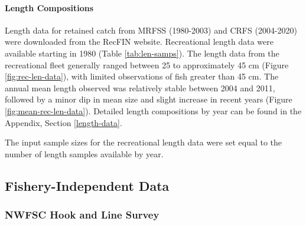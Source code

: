 \documentclass[11pt,
  english,
  a4paper,
]{article}
\begin{document}

\hypertarget{length-compositions-1}{%
\paragraph{Length Compositions}\label{length-compositions-1}}

\leavevmode\tagmcend\tagstructend


Length data for retained catch from MRFSS (1980-2003) and CRFS (2004-2020) were downloaded from the RecFIN website. Recreational length data were available starting in 1980 (Table \ref{tab:len-samps}). The length data from the recreational fleet generally ranged between 25 to approximately 45 cm (Figure \ref{fig:rec-len-data}), with limited observations of fish greater than 45 cm. The annual mean length observed was relatively stable between 2004 and 2011, followed by a minor dip in mean size and slight increase in recent years (Figure \ref{fig:mean-rec-len-data}). Detailed length compositions by year can be found in the Appendix, Section \ref{length-data}.

\leavevmode\tagmcend\tagstructend\par


The input sample sizes for the recreational length data were set equal to the number of length samples available by year.

\leavevmode\tagmcend\tagstructend\par


\hypertarget{fishery-independent-data}{%
\subsection{Fishery-Independent Data}\label{fishery-independent-data}}

\leavevmode\tagmcend\tagstructend


\hypertarget{nwfsc-hook-and-line-survey}{%
\subsubsection{NWFSC Hook and Line Survey}\label{nwfsc-hook-and-line-survey}}
\end{document}
